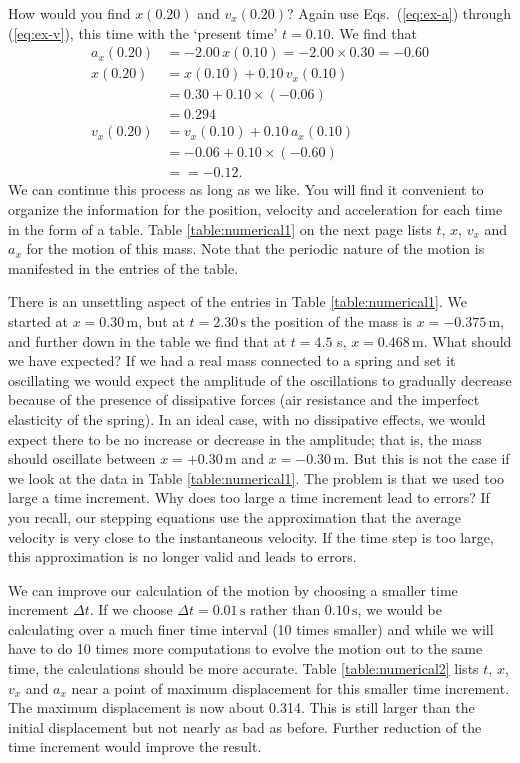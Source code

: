 How would you find $x(0.20)$ and $v_x(0.20)$?  Again use
Eqs.~(\ref{eq:ex-a}) through (\ref{eq:ex-v}), this time with the
`present time' $t = 0.10$.  We find that
\begin{align}
a_x(0.20) &= -2.00\, x(0.10) = -2.00\times 0.30 = -0.60\\
x(0.20) &= x(0.10) + 0.10\, v_x(0.10) \nonumber \\
        &= 0.30 + 0.10 \times (-0.06) \nonumber \\
        &= 0.294 \\
v_x(0.20) &= v_x(0.10) + 0.10\, a_x(0.10) \nonumber  \\
        &= -0.06 + 0.10\times(-0.60) \nonumber \\
        &= = -0.12.
\end{align}
We can continue this process as long as we like.  You will find it
convenient to organize the information for the position, velocity and
acceleration for each time in the form of a table.  Table
\ref{table:numerical1} on the next page lists $t$, $x$, $v_x$ and $a_x$ for
the motion of this mass.  Note that the periodic nature of the motion
is manifested in the entries of the table.  

There is an unsettling aspect of the entries in Table
\ref{table:numerical1}.  We started at $x = 0.30\, \mbox{m}$, but at
$t = 2.30\, \mbox{s}$ the position of the mass is $x = -0.375\,
\mbox{m}$, and further down in the table we find that at $t = 4.5$ s,
$x = 0.468\, \mbox{m}$.  What should we have expected?  If we had a
real mass connected to a spring and set it oscillating we would expect
the amplitude of the oscillations to gradually decrease because of the
presence of dissipative forces (air resistance and the imperfect
elasticity of the spring).  In an ideal case, with no dissipative
effects, we would expect there to be no increase or decrease in the
amplitude; that is, the mass should oscillate between $x = +0.30\,
\mbox{m}$ and $x = -0.30\, \mbox{m}$.  But this is not the case if we
look at the data in Table \ref{table:numerical1}.  The problem is that
we used too large a time increment.  Why does too large a time
increment lead to errors?  If you recall, our stepping equations use
the approximation that the average velocity is very close to the
instantaneous velocity.  If the time step is too large, this
approximation is no longer valid and leads to errors.
   
We can improve our calculation of the motion by choosing a smaller
time increment $\Delta t$.  If we choose $\Delta t = 0.01\, \mbox{s}$
rather than $0.10\, \mbox{s}$, we would be calculating over a much
finer time interval (10 times smaller) and while we will have to do 10
times more computations to evolve the motion out to the same time, the
calculations should be more accurate.  Table \ref{table:numerical2}
lists $t$, $x$, $v_x$ and $a_x$ near a point of maximum displacement for
this smaller time increment.  The maximum displacement is now about
0.314.  This is still larger than the initial displacement but not
nearly as bad as before.  Further reduction of the time increment
would improve the result.

